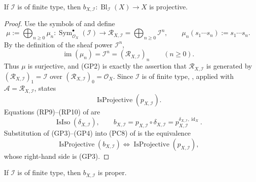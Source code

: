 \begin{theorem}
  \label{thm:nagata-global-blowup-projective}

  If \(\mathcal I\) is of finite type, then
  \(b_{X,\mathcal I}\colon\operatorname{Bl}_{\mathcal I}(X)\to X\) is
  projective.
\end{theorem}

\begin{proof}
  Use the symbols of
   and define
  \[
    \mu:=\bigoplus_{n\geq0}\mu_n\colon
      \operatorname{Sym}_{\mathcal O_X}^{\bullet}(\mathcal I)
        \longrightarrow
      \mathscr R_{X,\mathcal I}=\bigoplus_{n\geq0}\mathcal I^n,
    \qquad
    \mu_n(s_1\cdots s_n):=s_1\cdots s_n.                       \tag{GP1}
  \]
  By the definition of the sheaf power $\mathcal I^n$,
  \[
    \operatorname{im}(\mu_n)=\mathcal I^n
      =(\mathscr R_{X,\mathcal I})_n\qquad(n\geq0).             \tag{GP2}
  \]
  Thus $\mu$ is surjective, and (GP2) is exactly the assertion that
  $\mathscr R_{X,\mathcal I}$ is generated by
  $(\mathscr R_{X,\mathcal I})_1=\mathcal I$ over
  $(\mathscr R_{X,\mathcal I})_0=\mathcal O_X$.  Since $\mathcal I$ is of
  finite type,
  \cite[\href{https://stacks.math.columbia.edu/tag/07ZS}{Tag 07ZS}]
  {stacks-project}, applied with
  $\mathcal A=\mathscr R_{X,\mathcal I}$, states
  \[
    \operatorname{IsProjective}(p_{X,\mathcal I}).              \tag{GP3}
  \]
  Equations (RP9)--(RP10) of
   are
  \[
    \operatorname{IsIso}(\delta_{X,\mathcal I}),
    \qquad
    b_{X,\mathcal I}=p_{X,\mathcal I}\circ\delta_{X,\mathcal I}
      =p_{X,\mathcal I}^{\delta_{X,\mathcal I},\operatorname{id}_X}.
                                                                    \tag{GP4}
  \]
  Substitution of (GP3)--(GP4) into (PC8) of
   is the equivalence
  \[
    \operatorname{IsProjective}(b_{X,\mathcal I})
      \Longleftrightarrow
    \operatorname{IsProjective}(p_{X,\mathcal I}),
  \]
  whose right-hand side is (GP3).
\end{proof}

\begin{theorem}
  \label{thm:nagata-global-blowup-proper}

  If \(\mathcal I\) is of finite type, then
  \(b_{X,\mathcal I}\) is proper.
\end{theorem}

